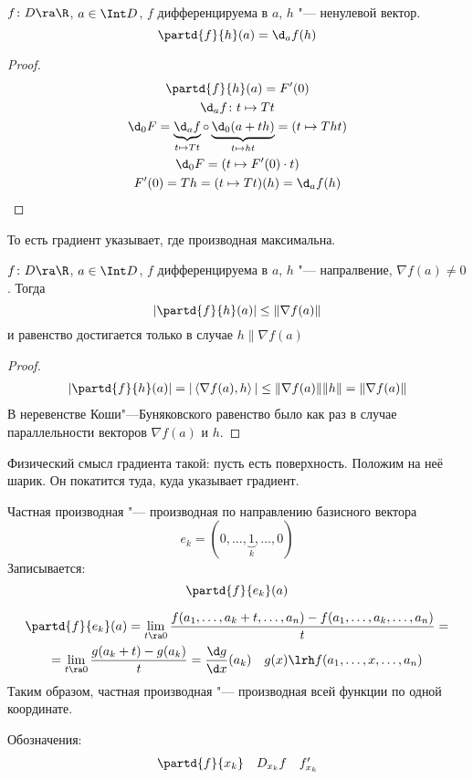 \begin{assertion}
	$f\colon D \ra \R$, $a \in \Int D$, $f$ дифференцируема в $a$, $h$ "--- ненулевой вектор.
	\[ \partd{f}{h}(a) = \d_a f(h) \]
\end{assertion}
\begin{proof}
	\begin{gather*}
		\partd{f}{h}(a) = F'(0) \\
		\d_a f\colon t \mapsto Tt \\
		\d_0 F = \underbrace{\d_a f}_{t \mapsto Tt} \circ \underbrace{\d_0 (a + th)}_{t \mapsto ht} = (t \mapsto Tht) \\
		\d_0 F = (t \mapsto F'(0) \cdot t) \\
		F'(0) = Th = (t \mapsto Tt)(h) = \d_a f(h)
	\end{gather*}
\end{proof}
То есть градиент указывает, где производная максимальна.
\begin{theorem}
	$f\colon D \ra \R$, $a \in \Int D$, $f$ дифференцируема в $a$, $h$ "--- напралвение, $\nabla f(a) \ne 0$.
	Тогда
	\[ \left|\partd{f}{h}(a)\right| \le \|\nabla f(a) \| \]
	и равенство достигается только в случае $h \parallel \nabla f(a)$
\end{theorem}
\begin{proof}
	\begin{gather*}
		\left|\partd{f}{h}(a)\right| = |\left< \nabla f(a), h\right>| \le \|\nabla f(a)\| \|h\| = \|\nabla f(a) \|
	\end{gather*}
	В неревенстве Коши"---Буняковского равенство было как раз в случае параллельности векторов $\nabla f(a)$ и $h$.
\end{proof}

Физический смысл градиента такой: пусть есть поверхность. Положим на неё шарик. Он покатится туда, куда указывает градиент.

\begin{Def}
	Частная производная "--- производная по направлению базисного вектора
	\[ e_k = (0, \dots, \underbrace{1}_{k}, \dots, 0) \]
	Записывается:
	\[ \partd{f}{e_k} (a) \]
\end{Def}
\begin{Rem}
	\begin{gather*}
		\partd{f}{e_k} (a) = \lim_{t \ra 0} \frac{f(a_1, \dots, a_k + t, \dots, a_n) - f(a_1, \dots, a_k, \dots, a_n)}t = \\
		= \lim_{t \ra 0} \frac{g(a_k + t) - g(a_k)}t = \frac{\d g}{\d x} (a_k) \quad g(x) \lrh f(a_1, \dots, x, \dots, a_n)
	\end{gather*}
	Таким образом, частная производная "--- производная всей функции по одной координате.
\end{Rem}
Обозначения:
\[
	\begin{matrix}
		\partd{f}{x_k} & D_{x_k} f & f'_{x_k}
	\end{matrix}
\]


